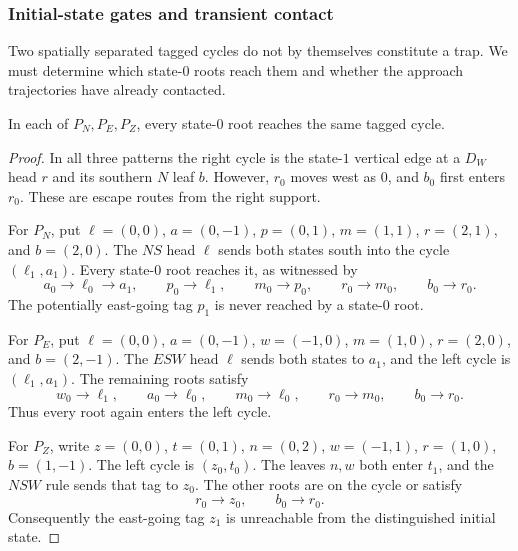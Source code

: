 \subsubsection{Initial-state gates and transient contact}

Two spatially separated tagged cycles do not by themselves constitute a
trap. We must determine which state-\(0\) roots reach them and whether
the approach trajectories have already contacted.

\begin{lemma}\label{t:reset-gates}
In each of \(P_N,P_E,P_Z\), every state-\(0\) root reaches the same
tagged cycle.
\end{lemma}
\begin{proof}
In all three patterns the right cycle is the state-\(1\) vertical edge
at a \(D_W\) head \(r\) and its southern \(N\) leaf \(b\). However,
\(r_0\) moves west as \(0\), and \(b_0\) first enters \(r_0\).
These are escape routes from the right support.

For \(P_N\), put \(\ell=(0,0)\), \(a=(0,-1)\), \(p=(0,1)\),
\(m=(1,1)\), \(r=(2,1)\), and \(b=(2,0)\). The \(NS\) head
\(\ell\) sends both states south into the cycle
\((\ell_1,a_1)\). Every state-\(0\) root reaches it, as witnessed by
\[
 a_0\to\ell_0\to a_1,\qquad
 p_0\to\ell_1,\qquad
 m_0\to p_0,\qquad r_0\to m_0,\qquad b_0\to r_0.
\]
The potentially east-going tag \(p_1\) is never reached by a
state-\(0\) root.

For \(P_E\), put \(\ell=(0,0)\), \(a=(0,-1)\), \(w=(-1,0)\),
\(m=(1,0)\), \(r=(2,0)\), and \(b=(2,-1)\). The \(ESW\) head
\(\ell\) sends both states to \(a_1\), and the left cycle is
\((\ell_1,a_1)\). The remaining roots satisfy
\[
 w_0\to\ell_1,\qquad a_0\to\ell_0,\qquad
 m_0\to\ell_0,\qquad r_0\to m_0,\qquad b_0\to r_0.
\]
Thus every root again enters the left cycle.

For \(P_Z\), write \(z=(0,0)\), \(t=(0,1)\), \(n=(0,2)\),
\(w=(-1,1)\), \(r=(1,0)\), \(b=(1,-1)\).
The left cycle is \((z_0,t_0)\). The leaves \(n,w\) both enter
\(t_1\), and the \(NSW\) rule sends that tag to \(z_0\).
The other roots are on the cycle or satisfy
\[
 r_0\to z_0,\qquad b_0\to r_0.
\]
Consequently the east-going tag \(z_1\) is unreachable from the
distinguished initial state.
\end{proof}

